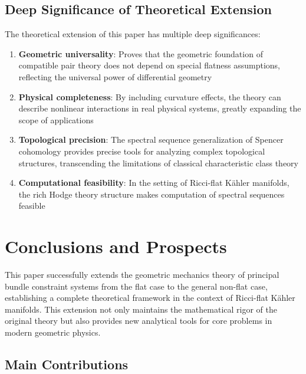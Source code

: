 \documentclass[a4paper,12pt]{extarticle}
\theoremstyle{definition}
\begin{document}
\subsection{Deep Significance of Theoretical Extension}

The theoretical extension of this paper has multiple deep significances:

\begin{enumerate}
\item \textbf{Geometric universality}: Proves that the geometric foundation of compatible pair theory does not depend on special flatness assumptions, reflecting the universal power of differential geometry

\item \textbf{Physical completeness}: By including curvature effects, the theory can describe nonlinear interactions in real physical systems, greatly expanding the scope of applications

\item \textbf{Topological precision}: The spectral sequence generalization of Spencer cohomology provides precise tools for analyzing complex topological structures, transcending the limitations of classical characteristic class theory

\item \textbf{Computational feasibility}: In the setting of Ricci-flat Kähler manifolds, the rich Hodge theory structure makes computation of spectral sequences feasible
\end{enumerate}

\section{Conclusions and Prospects}

This paper successfully extends the geometric mechanics theory of principal bundle constraint systems from the flat case to the general non-flat case, establishing a complete theoretical framework in the context of Ricci-flat Kähler manifolds. This extension not only maintains the mathematical rigor of the original theory but also provides new analytical tools for core problems in modern geometric physics.

\subsection{Main Contributions}
\end{document}
